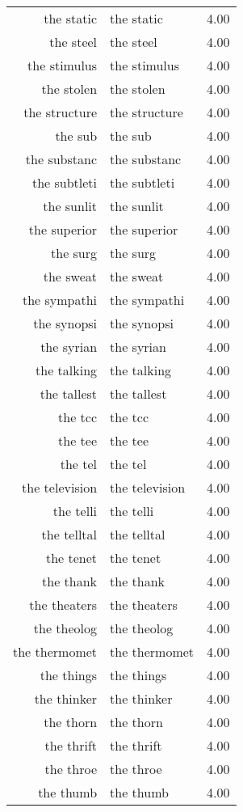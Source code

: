 \begin{table}[ht]
\begin{tabular}{rlr}
  the static & the static & 4.00 \\ 
  the steel & the steel & 4.00 \\ 
  the stimulus & the stimulus & 4.00 \\ 
  the stolen & the stolen & 4.00 \\ 
  the structure & the structure & 4.00 \\ 
  the sub & the sub & 4.00 \\ 
  the substanc & the substanc & 4.00 \\ 
  the subtleti & the subtleti & 4.00 \\ 
  the sunlit & the sunlit & 4.00 \\ 
  the superior & the superior & 4.00 \\ 
  the surg & the surg & 4.00 \\ 
  the sweat & the sweat & 4.00 \\ 
  the sympathi & the sympathi & 4.00 \\ 
  the synopsi & the synopsi & 4.00 \\ 
  the syrian & the syrian & 4.00 \\ 
  the talking & the talking & 4.00 \\ 
  the tallest & the tallest & 4.00 \\ 
  the tcc & the tcc & 4.00 \\ 
  the tee & the tee & 4.00 \\ 
  the tel & the tel & 4.00 \\ 
  the television & the television & 4.00 \\ 
  the telli & the telli & 4.00 \\ 
  the telltal & the telltal & 4.00 \\ 
  the tenet & the tenet & 4.00 \\ 
  the thank & the thank & 4.00 \\ 
  the theaters & the theaters & 4.00 \\ 
  the theolog & the theolog & 4.00 \\ 
  the thermomet & the thermomet & 4.00 \\ 
  the things & the things & 4.00 \\ 
  the thinker & the thinker & 4.00 \\ 
  the thorn & the thorn & 4.00 \\ 
  the thrift & the thrift & 4.00 \\ 
  the throe & the throe & 4.00 \\ 
  the thumb & the thumb & 4.00 \\ 

\end{tabular}
\end{table}
